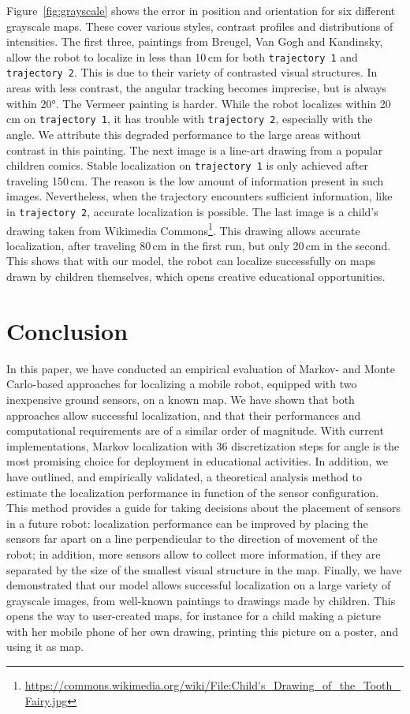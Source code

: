 \documentclass[letterpaper, 10pt, conference]{ieeeconf}
\newcommand{\Fig}[1]{Figure~\ref{fig:#1}}
\begin{document}
\Fig{grayscale} shows the error in position and orientation for six different grayscale maps.
These cover various styles, contrast profiles and distributions of intensities.
The first three, paintings from Breugel, Van Gogh and Kandinsky, allow the robot to localize in less than 10\,cm for both \texttt{trajectory~1} and \texttt{trajectory~2}.
This is due to their variety of contrasted visual structures.
In areas with less contrast, the angular tracking becomes imprecise, but is always within 20°.
The Vermeer painting is harder.
While the robot localizes within 20\,cm on \texttt{trajectory~1}, it has trouble with \texttt{trajectory~2}, especially with the angle.
We attribute this degraded performance to the large areas without contrast in this painting.
The next image is a line-art drawing from a popular children comics.
Stable localization on \texttt{trajectory~1} is only achieved after traveling 150\,cm.
The reason is the low amount of information present in such images.
Nevertheless, when the trajectory encounters sufficient information, like in \texttt{trajectory~2}, accurate localization is possible.
The last image is a child's drawing taken from Wikimedia Commons\footnote{\url{https://commons.wikimedia.org/wiki/File:Child's_Drawing_of_the_Tooth_Fairy.jpg}}.
This drawing allows accurate localization, after traveling 80\,cm in the first run, but only 20\,cm in the second.
This shows that with our model, the robot can localize successfully on maps drawn by children themselves, which opens creative educational opportunities.

\section{Conclusion}

In this paper, we have conducted an empirical evaluation of Markov- and Monte Carlo-based approaches for localizing a mobile robot, equipped with two inexpensive ground sensors, on a known map.
We have shown that both approaches allow successful localization, and that their performances and computational requirements are of a similar order of magnitude.
With current implementations, Markov localization with 36 discretization steps for angle is the most promising choice for deployment in educational activities.
In addition, we have outlined, and empirically validated, a theoretical analysis method to estimate the localization performance in function of the sensor configuration.
This method provides a guide for taking decisions about the placement of sensors in a future robot:
localization performance can be improved by placing the sensors far apart on a line perpendicular to the direction of movement of the robot; in addition, more sensors allow to collect more information, if they are separated by the size of the smallest visual structure in the map.
Finally, we have demonstrated that our model allows successful localization on a large variety of grayscale images, from well-known paintings to drawings made by children.
This opens the way to user-created maps, for instance for a child making a picture with her mobile phone of her own drawing, printing this picture on a poster, and using it as map.
\end{document}
